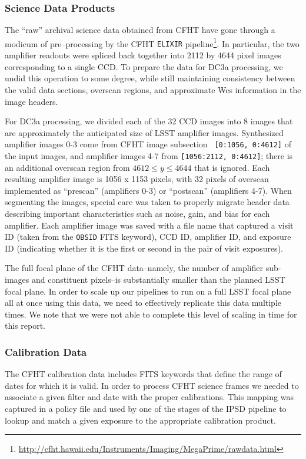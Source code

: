 \subsubsection{Science Data Products}

The ``raw'' archival science data obtained from CFHT have gone through
a modicum of pre--processing by the CFHT {\tt ELIXIR}
pipeline\footnote{\url{http://cfht.hawaii.edu/Instruments/Imaging/MegaPrime/rawdata.html}}.
In particular, the two amplifier readouts were spliced back together
into 2112 by 4644 pixel images corresponding to a single CCD.  To
prepare the data for DC3a processing, we undid this operation to some
degree, while still maintaining consistency between the valid data
sections, overscan regions, and approximate Wcs information in the
image headers. 

For DC3a processing, we divided each of the 32 CCD images into 8 images
that are approximately the anticipated size of LSST amplifier images.
Synthesized amplifier images 0-3 come from CFHT image subsection {\tt
[0:1056, 0:4612]} of the input images, and amplifier images 4-7 from
{\tt [1056:2112, 0:4612]}; there is an additional overscan region from
$4612 \leq y \leq 4644$ that is ignored.  Each resulting amplifier
image is 1056 x 1153 pixels, with 32 pixels of overscan implemented as
``prescan'' (amplifiers 0-3) or ``postscan'' (amplifiers 4-7).  
When segmenting the images, special care was taken to properly migrate
header data describing important characteristics such as noise, gain,
and bias for each amplifier.  Each amplifier image was saved with a
file name that captured a visit ID (taken from the \texttt{OBSID} FITS
keyword), CCD ID, amplifier ID, and exposure ID (indicating whether it
is the first or second in the pair of visit exposures).  

The full focal plane of the CFHT data--namely, the number of amplifier
sub-images and constituent pixels--is substantially smaller than
the planned LSST focal plane.  In order to scale up our pipelines to
run on a full LSST focal plane all at once using this data, we need to
effectively replicate this data multiple times.  We note that we were
not able to complete this level of scaling in time for this report.  

\subsubsection{Calibration Data}

The CFHT calibration data includes FITS keywords that define the range
of dates for which it is valid.  In order to process CFHT science frames
we needed to associate a given filter and date with the proper
calibrations.  This mapping was captured in a policy file and used by
one of the stages of the IPSD pipeline to lookup and match a given
exposure to the appropriate calibration product.  

